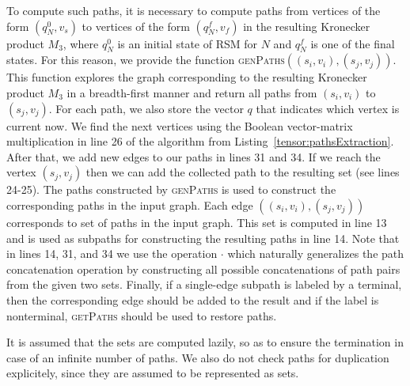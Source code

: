 To compute such paths, it is necessary to compute paths from vertices of the form $(q_N^0,v_s)$ to vertices of the form $(q_N^f, v_f)$ in the resulting Kronecker product $M_3$, where $q_N^0$ is an initial state of RSM for $N$ and $q_N^f$ is one of the final states.
For this reason, we provide the function \textsc{genPaths}$((s_i,v_i),(s_j,v_j))$. This function explores the graph corresponding to the resulting Kronecker product $M_3$ in a breadth-first manner and return all paths from $(s_i,v_i)$ to $(s_j,v_j)$. For each path, we also store the vector $q$ that indicates which vertex is current now. We find the next vertices using the Boolean vector-matrix multiplication in line 26 of the algorithm from Listing~\ref{tensor:pathsExtraction}. After that, we add new edges to our paths in lines 31 and 34. If we reach the vertex $(s_j,v_j)$ then we can add the collected path to the resulting set (see lines 24-25). The paths constructed by \textsc{genPaths} is used to construct the corresponding paths in the input graph. Each edge $((s_i,v_i),(s_j,v_j))$ corresponds to set of paths in the input graph. This set is computed in line 13 and is used as subpaths for constructing the resulting paths in line 14. Note that in lines 14, 31, and 34 we use the operation $\cdot$
which naturally generalizes the path concatenation operation by constructing all possible concatenations of path pairs from the given two sets. Finally, if a single-edge subpath is labeled by a terminal, then the corresponding edge should be added to the result and if the label is nonterminal, \textsc{getPaths} should be used to restore paths.

It is assumed that the sets are computed lazily, so as to ensure the termination in case of an infinite number of paths.
We also do not check paths for duplication explicitely, since they are assumed to be represented as sets.